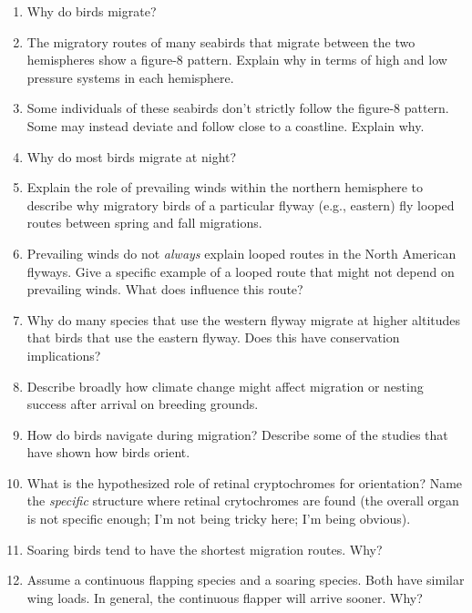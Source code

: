 \documentclass[nofonts, letterpaper]{tufte-handout}
\begin{document}
\begin{enumerate}

\item Why do birds migrate?

\item The migratory routes of many seabirds that migrate between the two hemispheres show a figure-8 pattern. Explain why in terms of high and low pressure systems in each hemisphere.

\item Some individuals of these seabirds don't strictly follow the figure-8 pattern. Some may instead deviate and follow close to a coastline. Explain why.

\item Why do most birds migrate at night?

\item Explain the role of prevailing winds within the northern hemisphere to describe why migratory birds of a particular flyway (e.g., eastern) fly looped routes between spring and fall migrations. 

\item Prevailing winds do not \emph{always} explain looped routes in the North American flyways. Give a specific example of a looped route that might not depend on prevailing winds. What does influence this route?

\item Why do many species that use the western flyway migrate at higher altitudes that birds that use the eastern flyway. Does this have conservation implications?

\item Describe broadly how climate change might affect migration or nesting success after arrival on breeding grounds.

\item How do birds navigate during migration? Describe some of the studies that have shown how birds orient.

\item What is the hypothesized role of retinal cryptochromes for orientation? Name the \emph{specific} structure where retinal crytochromes are found (the overall organ is not specific enough; I'm not being tricky here; I'm being obvious).

\item Soaring birds tend to have the shortest migration routes. Why?

\item Assume a continuous flapping species and a soaring species. Both have similar wing loads. In general, the continuous flapper will arrive sooner. Why?

\end{enumerate}
\end{document}
